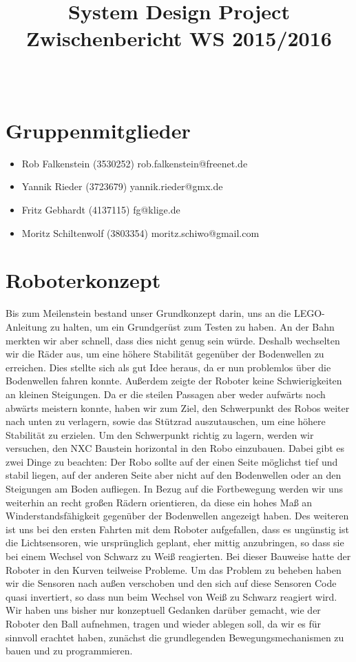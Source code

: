 \documentclass[11pt,a4paper]{article}
\title{
  \Huge System Design Project \\
  \LARGE Zwischenbericht WS 2015/2016
}
\author{
  \Large \todo{Der fühlende Psi Bot \#14}\\
}
\begin{document}
\maketitle

\section{Gruppenmitglieder}
\begin{itemize}
  \item {Rob Falkenstein (3530252) rob.falkenstein@freenet.de}
	\item	{Yannik Rieder (3723679) yannik.rieder@gmx.de}
	\item	{Fritz Gebhardt (4137115) fg@klige.de}
	\item	{Moritz Schiltenwolf (3803354) moritz.schiwo@gmail.com}
\end{itemize}

\section{Roboterkonzept}

Bis zum Meilenstein bestand unser Grundkonzept darin, uns an die LEGO-Anleitung zu halten, um ein Grundgerüst zum Testen zu haben. 
An der Bahn merkten wir aber schnell, dass dies nicht genug sein würde. Deshalb wechselten wir die Räder aus, um eine höhere Stabilität 
gegenüber der Bodenwellen zu erreichen. Dies stellte sich als gut Idee heraus, da er nun problemlos über die Bodenwellen fahren konnte.
Außerdem zeigte der Roboter keine Schwierigkeiten an kleinen Steigungen. Da er die steilen Passagen aber weder aufwärts noch abwärts
meistern konnte, haben wir zum Ziel, den Schwerpunkt des Robos weiter nach unten zu verlagern, sowie das Stützrad auszutauschen, um eine
höhere Stabilität zu erzielen. Um den Schwerpunkt richtig zu lagern, werden wir versuchen, den NXC Baustein horizontal in den Robo
einzubauen. Dabei gibt es zwei Dinge zu beachten: Der Robo sollte auf der einen Seite möglichst tief und stabil liegen, auf der anderen Seite
aber nicht auf den Bodenwellen oder an den Steigungen am Boden aufliegen. 
In Bezug auf die Fortbewegung werden wir uns weiterhin an recht großen Rädern orientieren, da diese ein hohes Maß an Winderstandsfähigkeit
gegenüber der Bodenwellen angezeigt haben.
Des weiteren ist uns bei den ersten Fahrten mit dem Roboter aufgefallen, dass es ungünstig ist die Lichtsensoren, wie ursprünglich geplant, 
eher mittig anzubringen, so dass sie bei einem Wechsel von Schwarz zu Weiß reagierten. Bei dieser Bauweise hatte der Roboter in den Kurven 
teilweise Probleme. Um das Problem zu beheben haben wir die Sensoren nach außen verschoben und den sich auf diese Sensoren Code quasi invertiert, 
so dass nun beim Wechsel von Weiß zu Schwarz reagiert wird.  
Wir haben uns bisher nur konzeptuell Gedanken darüber gemacht, wie der Roboter den Ball aufnehmen, tragen und wieder ablegen soll, da wir es für
sinnvoll erachtet haben, zunächst die grundlegenden Bewegungsmechanismen zu bauen und zu programmieren.
\end{document}
